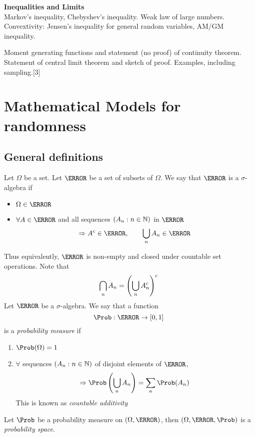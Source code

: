 \documentclass{article}
\numberwithin{equation}{section}
\begin{document}
{    \vspace{10pt}
    \noindent\textbf{Inequalities and Limits}\\
    Markov's inequality, Chebyshev's inequality. Weak law of large numbers. 
    Convextivity: Jensen's inequality for general random variables, AM/GM inequality.

    \vspace{5pt}
    \noindent Moment generating functions and statement (no proof) of continuity theorem. 
    Statement of central limit theorem and sketch of proof. Examples, including sampling.\hspace*{\fill}[3]
}
\tableofcontents


\section{Mathematical Models for randomness}
\subsection{General definitions}

Let $\Omega$ be a set. Let $\F$ be a set of subsets of $\Omega$.
We say that $\F$ is a $\sigma$-algebra if
\begin{itemize}
    \item $\Omega \in \F$
    \item $\forall A \in \F$ and all sequences $(A_n : n \in \mathbb{N})$ in $\F$
    \[\Rightarrow A^c \in \F, \qquad \bigcup_n A_n \in \F\]
\end{itemize}

Thus equivalently, $\F$ is non-empty and closed under countable set operations.
Note that 
\[ \bigcap_n A_n = \left( \bigcup_n A_n^c \right)^c\]
Let $\F$ be a $\sigma$-algebra. We say that a function
\[ \Prob: \F \rightarrow [0, 1] \]
is a \emph{probability measure} if
\begin{enumerate}
    \item $\Prob(\Omega) = 1$
    \item $\forall$ sequences $(A_n : n \in \mathbb{N})$ of disjoint elements of $\F$,
    \[\Rightarrow \Prob \bkt{\bigcup_n A_n} = \sum_n \Prob(A_n)\]
    This is known as \emph{countable additivity}
\end{enumerate}

Let $\Prob$ be a probability measure on $(\Omega, \F)$, then $(\Omega, \F, \Prob)$ is a \emph{probability space}.
\end{document}

